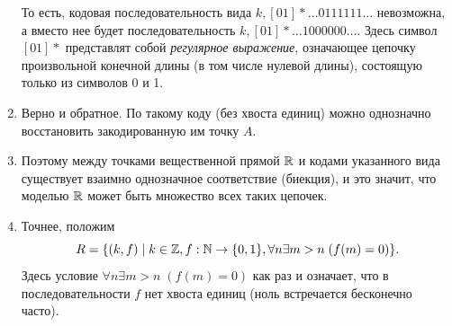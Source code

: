 \begin{enumerate}
То есть, кодовая последовательность вида $k,[01]*\dots 0111111\dots$ невозможна, а вместо нее будет последовательность $k,[01]*\dots 1000000\dots$. Здесь символ $[01]*$ представлят собой \textit{регулярное выражение}, означающее цепочку произвольной конечной длины (в том числе нулевой длины), состоящую только из символов 0 и 1.
\item Верно и обратное. По такому коду (без хвоста единиц) можно однозначно восстановить закодированную им точку $A$.
\item Поэтому между точками вещественной прямой $\mathbb R$ и кодами указанного вида существует взаимно однозначное соответствие (биекция), и это значит, что моделью $\mathbb R$ может быть множество всех таких цепочек.
\item Точнее, положим
$$
R=\{(k,f)\mid k\in\mathbb Z, f:\mathbb N\to\{0,1\}, \forall n\exists m>n\;(f(m)=0)\}.
$$
Здесь условие $\forall n\exists m>n\;(f(m)=0)$ как раз и означает, что в последовательности $f$ нет хвоста единиц (ноль встречается бесконечно часто).


\end{enumerate}
